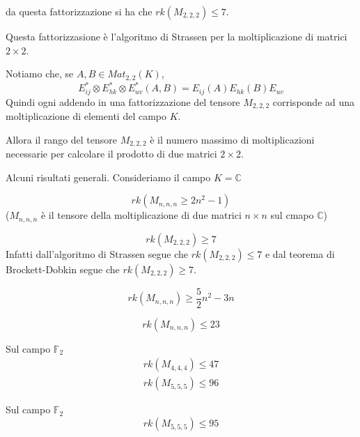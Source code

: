 \documentclass[../main.tex]{subfiles}
\begin{document}
da questa fattorizzazione si ha che $rk(M_{2,2,2}) \leq 7$.

Questa fattorizzasione è l'algoritmo di Strassen per la moltiplicazione di matrici $2 \times 2$.

Notiamo che, se $A,B \in Mat_{2,2}(K)$,
\begin{equation*}
    E_{ij}^* \otimes E_{hk}^* \otimes E_{uv}^* (A,B) = E_{ij}(A)E_{hk}(B)E_{uv}
\end{equation*}
Quindi ogni addendo in una fattorizzazione del tensore $M_{2,2,2}$ corrisponde ad una moltiplicazione di elementi del campo $K$.

Allora il rango del tensore $M_{2,2,2}$ è il numero massimo di moltiplicazioni necessarie per calcolare il prodotto di due matrici $2 \times 2$.

\newpage

Alcuni risultati generali. Consideriamo il campo $K = \mathbb{C}$
\begin{theorem}
    \begin{equation*}
        rk(M_{n,n,n} \geq 2n^2 -1)
    \end{equation*}
    ($M_{n,n,n}$ è il tensore della moltiplicazione di due matrici $n \times n$ sul cmapo $\mathbb{C}$)
\end{theorem}
\begin{corollary}
    \begin{equation*}
        rk(M_{2,2,2}) \geq 7
    \end{equation*}
    Infatti dall'algoritmo di Strassen segue che $rk(M_{2,2,2}) \leq 7$ e dal teorema di Brockett-Dobkin segue che $rk(M_{2,2,2}) \geq 7$.
\end{corollary}

\begin{theorem}[di Bläser (1999)]
    \begin{equation*}
        rk(M_{n,n,n}) \geq \frac{5}{2}n^2 - 3n
    \end{equation*}
\end{theorem}

\begin{theorem}[di Laderman (1976)]
    \begin{equation*}
        rk(M_{n,n,n}) \leq 23
    \end{equation*}
\end{theorem}

\begin{theorem}[Deepmind (2022)]
    Sul campo $\mathbb{F}_2$
    \begin{gather*}
        rk(M_{4,4,4}) \leq 47\\
        rk(M_{5,5,5}) \leq 96
    \end{gather*}

\end{theorem}

\begin{theorem}
    Sul campo $\mathbb{F}_2$
    \begin{equation*}
        rk(M_{5,5,5}) \leq 95
    \end{equation*}
\end{theorem}
\end{document}
